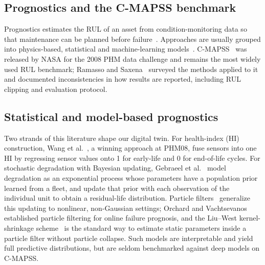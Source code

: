 \documentclass[pdflatex,sn-mathphys-num]{sn-jnl}
\begin{document}
\subsection{Prognostics and the C-MAPSS benchmark}
Prognostics estimates the RUL of an asset from condition-monitoring data so that maintenance can be planned before failure~\cite{jardine2006review,lei2018review}. Approaches are usually grouped into physics-based, statistical and machine-learning models~\cite{si2011review,lei2018review}. C-MAPSS~\cite{saxena2008damage} was released by NASA for the 2008 PHM data challenge and remains the most widely used RUL benchmark; Ramasso and Saxena~\cite{ramasso2014benchmark} surveyed the methods applied to it and documented inconsistencies in how results are reported, including RUL clipping and evaluation protocol.

\subsection{Statistical and model-based prognostics}
Two strands of this literature shape our digital twin. For health-index (HI) construction, Wang et al.~\cite{wang2008similarity}, a winning approach at PHM08, fuse sensors into one HI by regressing sensor values onto 1 for early-life and 0 for end-of-life cycles. For stochastic degradation with Bayesian updating, Gebraeel et al.~\cite{gebraeel2005residual} model degradation as an exponential process whose parameters have a population prior learned from a fleet, and update that prior with each observation of the individual unit to obtain a residual-life distribution. Particle filters~\cite{arulampalam2002tutorial} generalize this updating to nonlinear, non-Gaussian settings; Orchard and Vachtsevanos~\cite{orchard2009particle} established particle filtering for online failure prognosis, and the Liu--West kernel-shrinkage scheme~\cite{liu2001combined} is the standard way to estimate static parameters inside a particle filter without particle collapse. Such models are interpretable and yield full predictive distributions, but are seldom benchmarked against deep models on C-MAPSS.
\end{document}
